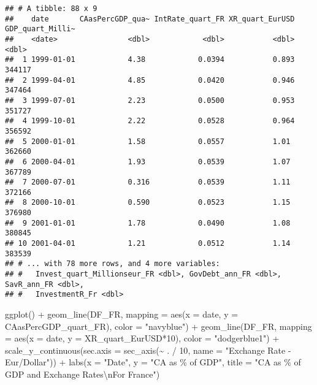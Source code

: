 \documentclass[
]{article}
\newenvironment{Shaded}{\begin{snugshade}}{\end{snugshade}}
\newcommand{\AttributeTok}[1]{\textcolor[rgb]{0.77,0.63,0.00}{#1}}
\newcommand{\DecValTok}[1]{\textcolor[rgb]{0.00,0.00,0.81}{#1}}
\newcommand{\FunctionTok}[1]{\textcolor[rgb]{0.00,0.00,0.00}{#1}}
\newcommand{\NormalTok}[1]{#1}
\newcommand{\SpecialCharTok}[1]{\textcolor[rgb]{0.00,0.00,0.00}{#1}}
\newcommand{\StringTok}[1]{\textcolor[rgb]{0.31,0.60,0.02}{#1}}
\begin{document}
\begin{verbatim}
## # A tibble: 88 x 9
##    date       CAasPercGDP_qua~ IntRate_quart_FR XR_quart_EurUSD GDP_quart_Milli~
##    <date>                <dbl>            <dbl>           <dbl>            <dbl>
##  1 1999-01-01            4.38            0.0394           0.893           344117
##  2 1999-04-01            4.85            0.0420           0.946           347464
##  3 1999-07-01            2.23            0.0500           0.953           351727
##  4 1999-10-01            2.22            0.0528           0.964           356592
##  5 2000-01-01            1.58            0.0557           1.01            362660
##  6 2000-04-01            1.93            0.0539           1.07            367789
##  7 2000-07-01            0.316           0.0539           1.11            372166
##  8 2000-10-01            0.590           0.0523           1.15            376980
##  9 2001-01-01            1.78            0.0490           1.08            380845
## 10 2001-04-01            1.21            0.0512           1.14            383539
## # ... with 78 more rows, and 4 more variables:
## #   Invest_quart_Millionseur_FR <dbl>, GovDebt_ann_FR <dbl>, SavR_ann_FR <dbl>,
## #   InvestmentR_Fr <dbl>
\end{verbatim}

\begin{Shaded}
\begin{Highlighting}[]
\FunctionTok{ggplot}\NormalTok{() }\SpecialCharTok{+} 
  \FunctionTok{geom\_line}\NormalTok{(DF\_FR, }\AttributeTok{mapping =} \FunctionTok{aes}\NormalTok{(}\AttributeTok{x =}\NormalTok{ date, }\AttributeTok{y =}\NormalTok{ CAasPercGDP\_quart\_FR), }\AttributeTok{color =} \StringTok{"navyblue"}\NormalTok{) }\SpecialCharTok{+}
  \FunctionTok{geom\_line}\NormalTok{(DF\_FR, }\AttributeTok{mapping =} \FunctionTok{aes}\NormalTok{(}\AttributeTok{x =}\NormalTok{ date, }\AttributeTok{y =}\NormalTok{ XR\_quart\_EurUSD}\SpecialCharTok{*}\DecValTok{10}\NormalTok{), }\AttributeTok{color =} \StringTok{"dodgerblue1"}\NormalTok{) }\SpecialCharTok{+}
  \FunctionTok{scale\_y\_continuous}\NormalTok{(}\AttributeTok{sec.axis =} \FunctionTok{sec\_axis}\NormalTok{(}\SpecialCharTok{\textasciitilde{}}\NormalTok{ . }\SpecialCharTok{/} \DecValTok{10}\NormalTok{, }\AttributeTok{name =} \StringTok{"Exchange Rate {-} Eur/Dollar"}\NormalTok{)) }\SpecialCharTok{+}
  \FunctionTok{labs}\NormalTok{(}\AttributeTok{x =} \StringTok{"Date"}\NormalTok{, }\AttributeTok{y =} \StringTok{"CA as \% of GDP"}\NormalTok{, }\AttributeTok{title =} \StringTok{"CA as \% of GDP and Exchange Rates}\SpecialCharTok{\textbackslash{}n}\StringTok{For France"}\NormalTok{)}
\end{Highlighting}
\end{Shaded}
\end{document}
